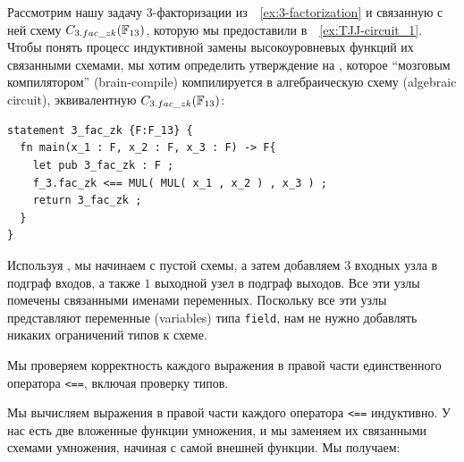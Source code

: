 \begin{example}[$3$-факторизация] Рассмотрим нашу задачу $3$-факторизации из~\examplename{}~\ref{ex:3-factorization} и связанную с ней схему $C_{3.fac\_zk}(\mathbb{F}_{13})$, которую мы предоставили в~\examplename{}~\ref{ex:TJJ-circuit_1}. Чтобы понять процесс индуктивной замены высокоуровневых функций их связанными схемами, мы хотим определить утверждение на , которое ``мозговым компилятором'' (brain-compile) компилируется в алгебраическую схему (algebraic circuit), эквивалентную $C_{3.fac\_zk}(\mathbb{F}_{13})$:
\begin{lstlisting}
statement 3_fac_zk {F:F_13} {
  fn main(x_1 : F, x_2 : F, x_3 : F) -> F{
	let pub 3_fac_zk : F ;
    f_3.fac_zk <== MUL( MUL( x_1 , x_2 ) , x_3 ) ;
    return 3_fac_zk ;
  }
}
\end{lstlisting} 
Используя , мы начинаем с пустой схемы, а затем добавляем $3$ входных узла в подграф входов, а также $1$ выходной узел в подграф выходов. Все эти узлы помечены связанными именами переменных. Поскольку все эти узлы представляют переменные (variables) типа \texttt{field}, нам не нужно добавлять никаких ограничений типов к схеме.

Мы проверяем корректность каждого выражения в правой части единственного оператора \texttt{<==}, включая проверку типов.

Мы вычисляем выражения в правой части каждого оператора \texttt{<==} индуктивно. У нас есть две вложенные функции умножения, и мы заменяем их связанными схемами умножения, начиная с самой внешней функции. Мы получаем:
\begin{center}
\end{center}
\end{example}
